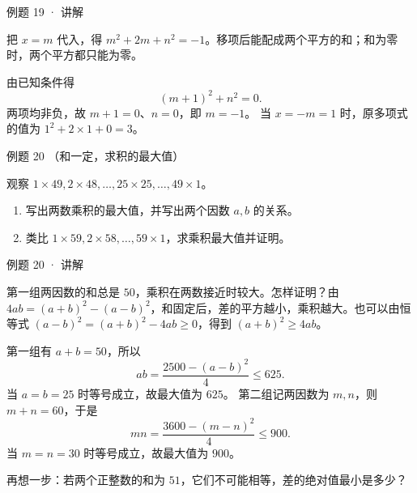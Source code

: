 
\begin{solution}{例题 19 · 讲解}

\think 把 $x=m$ 代入，得 $m^2+2m+n^2=-1$。移项后能配成两个平方的和；和为零时，两个平方都只能为零。

\solve 由已知条件得
\[(m+1)^2+n^2=0.\]
两项均非负，故 $m+1=0$、$n=0$，即 $m=-1$。
当 $x=-m=1$ 时，原多项式的值为 $1^2+2\times1+0=3$。


\end{solution}


\begin{problem}{例题 20 （和一定，求积的最大值）}

观察 $1\times49,2\times48,\ldots,25\times25,\ldots,49\times1$。
\begin{enumerate}[label=(\arabic*)]
\item 写出两数乘积的最大值，并写出两个因数 $a,b$ 的关系。
\item 类比 $1\times59,2\times58,\ldots,59\times1$，求乘积最大值并证明。
\end{enumerate}

\end{problem}


\begin{solution}{例题 20 · 讲解}

\think 第一组两因数的和总是 $50$，乘积在两数接近时较大。怎样证明？由 $4ab=(a+b)^2-(a-b)^2$，和固定后，差的平方越小，乘积越大。也可以由恒等式 $(a-b)^2=(a+b)^2-4ab\ge0$，得到 $(a+b)^2\ge4ab$。

\solve 第一组有 $a+b=50$，所以
\[ab=\frac{2500-(a-b)^2}{4}\le625.\]
当 $a=b=25$ 时等号成立，故最大值为 $625$。
第二组记两因数为 $m,n$，则 $m+n=60$，于是
\[mn=\frac{3600-(m-n)^2}{4}\le900.\]
当 $m=n=30$ 时等号成立，故最大值为 $900$。

再想一步：若两个正整数的和为 $51$，它们不可能相等，差的绝对值最小是多少？


\end{solution}


